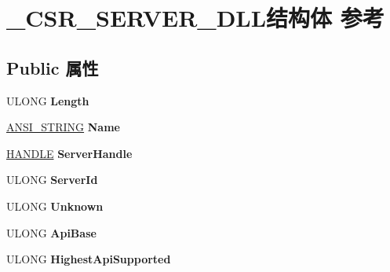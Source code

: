 \hypertarget{struct___c_s_r___s_e_r_v_e_r___d_l_l}{}\section{\+\_\+\+C\+S\+R\+\_\+\+S\+E\+R\+V\+E\+R\+\_\+\+D\+L\+L结构体 参考}
\label{struct___c_s_r___s_e_r_v_e_r___d_l_l}
\subsection*{Public 属性}
\begin{DoxyCompactItemize}
\item 
\mbox{\label{struct___c_s_r___s_e_r_v_e_r___d_l_l_aaacbe75d8598f7760d1294d539ed60c0}} 
U\+L\+O\+NG {\bfseries Length}
\item 
\mbox{\label{struct___c_s_r___s_e_r_v_e_r___d_l_l_a6f5cce4446dadd522b33f8f4683d8cf0}} 
\hyperlink{struct___a_n_s_i___s_t_r_i_n_g}{A\+N\+S\+I\+\_\+\+S\+T\+R\+I\+NG} {\bfseries Name}
\item 
\mbox{\label{struct___c_s_r___s_e_r_v_e_r___d_l_l_aca238142e7e4c9b77b2866749dca0987}} 
\hyperlink{interfacevoid}{H\+A\+N\+D\+LE} {\bfseries Server\+Handle}
\item 
\mbox{\label{struct___c_s_r___s_e_r_v_e_r___d_l_l_aaa4205c2880f203888b53fc959542d22}} 
U\+L\+O\+NG {\bfseries Server\+Id}
\item 
\mbox{\label{struct___c_s_r___s_e_r_v_e_r___d_l_l_a970bcd964b46d7ffaca4bbcc3fb7245a}} 
U\+L\+O\+NG {\bfseries Unknown}
\item 
\mbox{\label{struct___c_s_r___s_e_r_v_e_r___d_l_l_aaa77df47d2b7bf473277f0f3645816ed}} 
U\+L\+O\+NG {\bfseries Api\+Base}
\item 
\mbox{\label{struct___c_s_r___s_e_r_v_e_r___d_l_l_a1fc7d4b8961c97035411f57f6a603e64}} 
U\+L\+O\+NG {\bfseries Highest\+Api\+Supported}
\item 

\end{DoxyCompactItemize}
